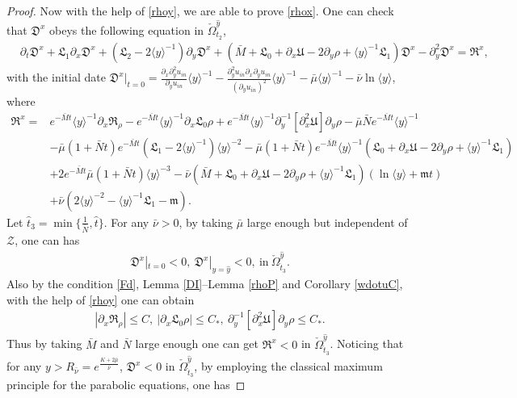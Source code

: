 \documentclass{amsart}
\numberwithin{equation}{section}
\newcommand\y{{{\langle y \rangle}}}
\begin{document}
\begin{proof}
Now with the help of \eqref{rhoy}, we are able to prove \eqref{rhox}.
One can check that $\mathfrak{D}^{x}$ obeys the following equation in $\check{\Omega}_{t_{2}}^{\hat{y}}$,
\begin{align*}
&\partial_{t}\mathfrak{D}^{x}
+\mathfrak{L}_{1}\partial_{x}\mathfrak{D}^{x}
+(\mathfrak{L}_{2}-2\y^{-1})\partial_{y}\mathfrak{D}^{x}
+(\bar{M}+\mathfrak{L}_{0}+\partial_{x}\mathfrak{U}-2\partial_{y}\rho+\y^{-1}\mathfrak{L}_{1})\mathfrak{D}^{x}
-\partial_{y}^{2}\mathfrak{D}^{x}
=\mathfrak{R}^{x},
\end{align*}
with the initial date
$\mathfrak{D}^{x}|_{t=0}
=\frac{\partial_{x}\partial_{y}^{2}u_{in}}{\partial_{y}u_{in}}\y^{-1}
-\frac{\partial_{y}^{2}u_{in}\partial_{x}\partial_{y}u_{in}}{(\partial_{y}u_{in})^{2}}\y^{-1}
-\bar{\mu}\y^{-1}-\bar{\nu}\ln\y$, where
\begin{align*}
\mathfrak{R}^{x}
=& e^{-\bar{M}t}\y^{-1}\partial_{x}\mathfrak{R}_{\rho}
  -e^{-\bar{M}t}\y^{-1}\partial_{x}\mathfrak{L}_{0}\rho
  +e^{-\bar{M}t}\y^{-1}\partial_{y}^{-1}[\partial_{x}^{2}\mathfrak{U}]\partial_{y}\rho
  -\bar{\mu}\bar{N}e^{-\bar{M}t}\y^{-1}\\
 &-\bar{\mu}(1+\bar{N}t)e^{-\bar{M}t}(\mathfrak{L}_{1}-2\y^{-1})\y^{-2}
  -\bar{\mu}(1+\bar{N}t)e^{-\bar{M}t}\y^{-1}(\mathfrak{L}_{0}+\partial_{x}\mathfrak{U}-2\partial_{y}\rho+\y^{-1}\mathfrak{L}_{1})\\
 &+2e^{-\bar{M}t}\bar{\mu}(1+\bar{N}t)\y^{-3}
  -\bar{\nu}(\bar{M}+\mathfrak{L}_{0}+\partial_{x}\mathfrak{U}-2\partial_{y}\rho+\y^{-1}\mathfrak{L}_{1})(\ln\y+\mathfrak{m}t)\\
 &+\bar{\nu}(2\y^{-2}-\y^{-1}\mathfrak{L}_{1}-\mathfrak{m}).
\end{align*}
Let $\hat{t}_{3}=\min\{\frac{1}{\bar{N}},\hat{t}\}$.
For any $\bar{\nu}>0$, by taking $\bar{\mu}$ large enough but independent of $\mathcal{Z}$, one can has
\begin{align*}
\mathfrak{D}^{x}|_{t=0}<0,~
\mathfrak{D}^{x}|_{y=\hat{y}}<0,~\text{in}~\check{\Omega}_{\hat{t}_{3}}^{\hat{y}}.
\end{align*}
Also by the condition \eqref{Fd}, Lemma \ref{DI}--Lemma \ref{rhoP} and Corollary \eqref{wdotuC}, with the help of \eqref{rhoy} one can obtain
\begin{align*}
|\partial_{x}\mathfrak{R}_{\rho}|\leq C,~
|\partial_{x}\mathfrak{L}_{0}\rho|\leq C_{*},~
\partial_{y}^{-1}[\partial_{x}^{2}\mathfrak{U}]\partial_{y}\rho\leq C_{*}.
\end{align*}
Thus by taking $\bar{M}$ and $\bar{N}$ large enough one can get $\mathfrak{R}^{x}<0$ in $\check{\Omega}_{\hat{t}_{3}}^{\hat{y}}$. Noticing that for any $y>R_{\bar{\nu}}=e^{\frac{K+2\bar{\mu}}{\bar{\nu}}}$, $\mathfrak{D}^{x}<0$ in $\check{\Omega}_{\hat{t}_{3}}^{\hat{y}}$, by employing the classical maximum principle for the parabolic equations, one has

\end{proof}
\end{document}
